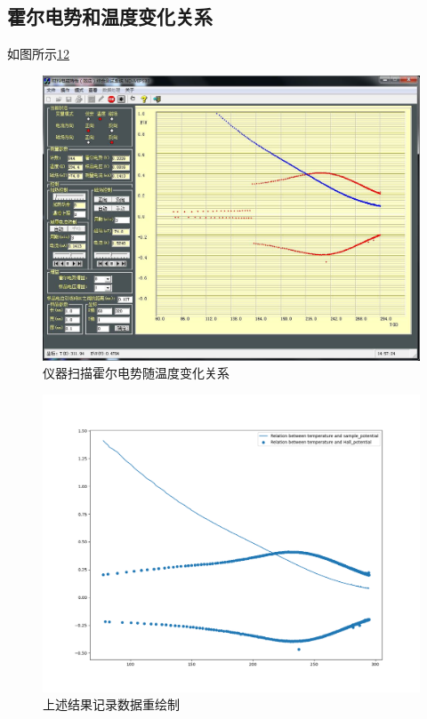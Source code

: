 \documentclass{buaaemp}
\begin{document}
\subsection{霍尔电势和温度变化关系}
如图所示\ref{fig:temp_magnetic}\ref{fig:repaint}
\begin{figure}
    \centering
    \includegraphics[width=\linewidth]{image/1.jpg}
    \caption{仪器扫描霍尔电势随温度变化关系}
    \label{fig:temp_magnetic}
\end{figure}

\begin{figure}
    \centering
    \includegraphics[width=\linewidth]{image/Potential_Temp.png}
    \caption{上述结果记录数据重绘制}
    \label{fig:repaint}
\end{figure}
\end{document}

